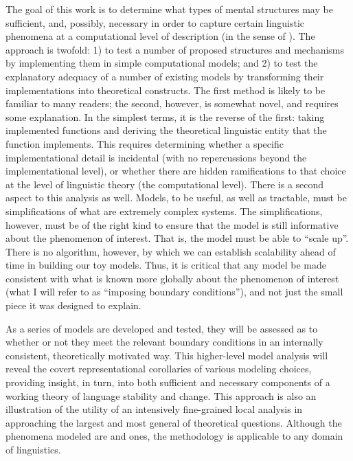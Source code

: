 The goal of this work is to determine what types of mental structures
may be sufficient, and, possibly, necessary in order to capture certain
linguistic phenomena at a computational level of description (in the
sense of \citealt{marr1982vision}). The approach is twofold: 1) to
test a number of proposed structures and mechanisms by implementing
them in simple computational models; and 2) to test the explanatory
adequacy of a number of existing models by transforming their implementations
into theoretical constructs. The first method is likely to be familiar
to many readers; the second, however, is somewhat novel, and requires
some explanation. In the simplest terms, it is the reverse of the
first: taking implemented functions and deriving the theoretical linguistic
entity that the function implements. This requires determining whether
a specific implementational detail is incidental (with no repercussions
beyond the implementational level), or whether there are hidden ramifications
to that choice at the level of linguistic theory (the computational
level). There is a second aspect to this analysis as well. Models,
to be useful, as well as tractable, must be simplifications of what
are extremely complex systems. The simplifications, however, must
be of the right kind to ensure that the model is still informative
about the phenomenon of interest. That is, the model must be able
to “scale up”. There is no algorithm, however, by which we can
establish scalability ahead of time in building our toy models. Thus,
it is critical that any model be made consistent with what is known
more globally about the phenomenon of interest (what I will refer to as ``imposing
boundary conditions''), and not just the small piece it was designed
to explain. 

As a series of models are developed and tested, they will be assessed
as to whether or not they meet the relevant boundary conditions in
an internally consistent, theoretically motivated way. This higher-level
model analysis will reveal the covert representational corollaries
of various modeling choices, providing insight, in turn, into both
sufficient and necessary components of a working theory of language
stability and change. This approach is also an illustration of the
utility of an intensively fine-grained local analysis in approaching
the largest and most general of theoretical questions. Although the
phenomena modeled are  and  ones, the methodology
is applicable to any domain of linguistics. 

